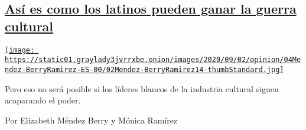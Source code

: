 \begin{enumerate}
\begin{enumerate}
{    \subsection{\texorpdfstring{\href{/es/2020/09/11/espanol/opinion/latinos-trump-elecciones.html}{Así
    es como los latinos pueden ganar la guerra
    cultural}}{Así es como los latinos pueden ganar la guerra cultural}}\label{asuxed-es-como-los-latinos-pueden-ganar-la-guerra-cultural}}

    \href{/es/2020/09/11/espanol/opinion/latinos-trump-elecciones.html}{\texttt{[image: https://static01.graylady3jvrrxbe.onion/images/2020/09/02/opinion/04Mendez-BerryRamirez-ES-00/02Mendez-BerryRamirez14-thumbStandard.jpg]}}

    Pero eso no será posible si los líderes blancos de la industria
    cultural siguen acaparando el poder.

    Por Elizabeth Méndez Berry y Mónica Ramírez
  \end{enumerate}
\end{enumerate}

